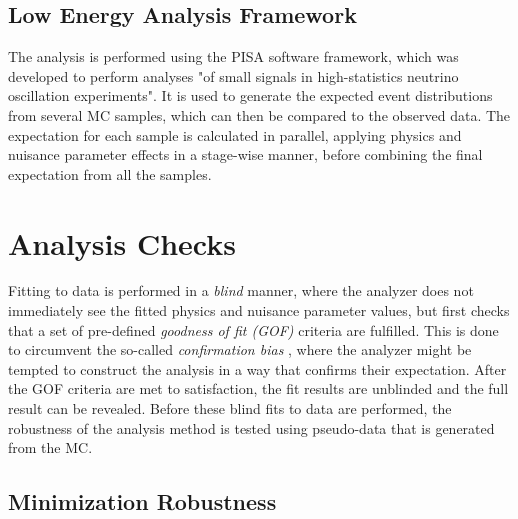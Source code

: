 \subsection{Low Energy Analysis Framework} 

The analysis is performed using the \textsc{PISA}  \cite{pisa_software} software framework, which was developed to perform analyses "of small signals in high-statistics neutrino oscillation experiments". It is used to generate the expected event distributions from several MC samples, which can then be compared to the observed data. The expectation for each sample is calculated in parallel, applying physics and nuisance parameter effects in a stage-wise manner, before combining the final expectation from all the samples.


\section{Analysis Checks}

Fitting to data is performed in a \textit{blind} manner, where the analyzer does not immediately see the fitted physics and nuisance parameter values, but first checks that a set of pre-defined \textit{goodness of fit (GOF)} criteria are fulfilled.
This is done to circumvent the so-called \textit{confirmation bias} , where the analyzer might be tempted to construct the analysis in a way that confirms their expectation. After the GOF criteria are met to satisfaction, the fit results are unblinded and the full result can be revealed. Before these blind fits to data are performed, the robustness of the analysis method is tested using pseudo-data that is generated from the MC.


\subsection{Minimization Robustness} 

